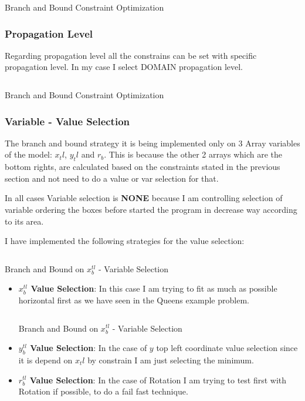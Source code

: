 \documentclass[12pt, a4paper]{article}
\begin{document}
\begin{listing}[H]
  \inputminted[firstline=153, lastline=156, linenos, breaklines]{cpp}{../src/space/box_space.cc}
  \caption{Branch and Bound Constraint Optimization}
  \label{lst:constrain}
\end{listing}

\subsubsection{Propagation Level}
Regarding propagation level all the constrains can be set with specific propagation level. In my case I select DOMAIN propagation level.

\begin{listing}[H]
  \inputminted[firstline=178, lastline=180, linenos, breaklines]{cpp}{../src/space/box_space.cc}
  \caption{Branch and Bound Constraint Optimization}
  \label{lst:prop}
\end{listing}

\subsubsection{Variable - Value Selection}
The branch and bound strategy it is being implemented only on 3 Array variables of the model: $x_tl$, $y_tl$ and $r_b$. This is because the other 2 arrays which are the bottom rights, are calculated based on the constraints stated in the previous section and not need to do a value or var selection for that.

In all cases Variable selection is \textbf{NONE} because I am controlling selection of variable ordering the boxes before started the program in decrease way according to its area.

I have implemented the following strategies for the value selection:

\begin{listing}[H]
  \inputminted[firstline=129, lastline=132, linenos, breaklines]{cpp}{../src/space/box_space.cc}
  \caption{Branch and Bound on $x_b^{tl}$ - Variable Selection}
\end{listing}

\begin{itemize}
\item \textbf{$x_b^{tl}$ Value Selection}: In this case I am trying to fit as much as possible horizontal first as we have seen in the Queens example problem.

  \begin{listing}[H]
  \inputminted[firstline=42, lastline=73, linenos, breaklines]{cpp}{../src/space/box_space.cc}
  \caption{Branch and Bound on $x_b^{tl}$ - Variable Selection}
\end{listing}


\item\label{item:var_y_b_tl} \textbf{$y_b^{tl}$ Value Selection}: In the case of $y$ top left coordinate value selection since it is depend on $x_tl$ by constrain I am just selecting the minimum.

\item \textbf{$r_b^{tl}$ Value Selection}: In the case of Rotation I am trying to test first with Rotation if possible, to do a fail fast technique.

\end{itemize}
\end{document}
